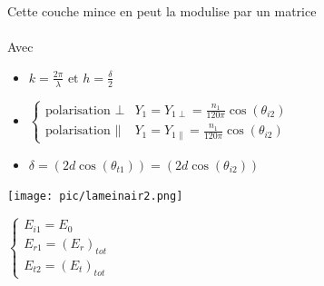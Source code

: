 \documentclass[12pt]{book}
\begin{document}
            \begin{center}
                \begin{minipage}{0.64\linewidth}
                    Cette couche mince en peut la modulise par un matrice \\
                    \\
                    Avec \begin{itemize}
                        \item $ k=\frac{2\pi}{\lambda} \text{ et } h = \frac{\delta}{2}$\\
                        \item $\begin{cases}
                            \text{polarisation $\perp$} & Y_1 = Y_{1\perp}=\frac{n_1}{120\pi}\cos(\theta_{i2})\\
                            \text{polarisation $\parallel$} & Y_1 = Y_{1\parallel}=\frac{n_1}{120\pi}\cos(\theta_{i2})
                            \end{cases}$
                        \item $\delta = (2d\cos(\theta_{t1}))=(2d\cos(\theta_{i2}))$
                    \end{itemize}
                    
                \end{minipage}
                \begin{minipage}{0.35\linewidth}
                    \texttt{[image: pic/lameinair2.png]}\\
                    \begin{center}
                        $\begin{cases}
                            E_{i1} = E_0 \\
                            E_{r1}=(E_r)_{tot} \\
                            E_{t2}=(E_t)_{tot}
                        \end{cases}$
                    \end{center}
                \end{minipage} 
            \end{center}
            
\end{document}
